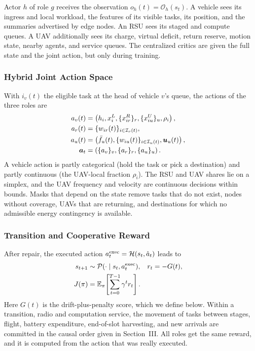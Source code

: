 Actor $h$ of role $g$ receives the observation $o_h(t)=\mathcal O_h(s_t)$. A
vehicle sees its ingress and local workload, the features of its visible
tasks, its position, and the summaries advertised by edge nodes. An RSU sees
its staged and compute queues. A UAV additionally sees its charge, virtual
deficit, return reserve, motion state, nearby agents, and service queues. The
centralized critics are given the full state and the joint action, but only
during training.

\subsubsection{Hybrid Joint Action Space}
With $i_v(t)$ the eligible task at the head of vehicle $v$'s queue, the
actions of the three roles are
\begin{align}
a_v(t)&=\left(h_i,x_i^{L},\{x_{ir}^{R}\}_{r},
\{x_{iu}^{U}\}_{u},\rho_i\right),\nonumber\\
a_r(t)&=\{w_{ir}(t)\}_{i\in\mathcal I_r(t)},\nonumber\\
a_u(t)&=\left(\bar f_u(t),\{w_{iu}(t)\}_{i\in\mathcal I_u(t)},
\boldsymbol{u}_u(t)\right),\nonumber\\
\boldsymbol{a}_t&=\left(\{a_v\}_v,\{a_r\}_r,\{a_u\}_u\right).
\label{eq:joint_action}
\end{align}
A vehicle action is partly categorical (hold the task or pick a destination)
and partly continuous (the UAV-local fraction $\rho_i$). The RSU and UAV
shares lie on a simplex, and the UAV frequency and velocity are continuous
decisions within bounds. Masks that depend on the state remove tasks that do
not exist, nodes without coverage, UAVs that are returning, and destinations
for which no admissible energy contingency is available.

\subsubsection{Transition and Cooperative Reward}
After repair, the executed action $a_t^{\rm exec}=\mathcal H(s_t,\hat a_t)$
leads to
\begin{align}
s_{t+1}&\sim\mathcal P(\cdot\mid s_t,a_t^{\rm exec}),
&r_t&=-G(t),\nonumber\\
J(\pi)&=\mathbb{E}_\pi\!\left[\sum_{t=0}^{T-1}\gamma^t r_t\right].
\label{eq:transition_reward}
\end{align}
Here $G(t)$ is the drift-plus-penalty score, which we define below. Within a
transition, radio and computation service, the movement of tasks between
stages, flight, battery expenditure, end-of-slot harvesting, and new arrivals
are committed in the causal order given in Section~III. All roles get the
same reward, and it is computed from the action that was really executed.

